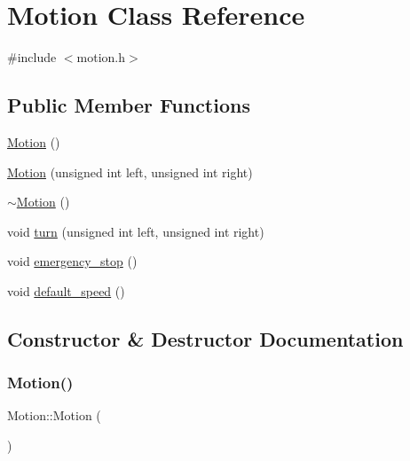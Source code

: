 \hypertarget{class_motion}{}\section{Motion Class Reference}
\label{class_motion}


{\ttfamily \#include $<$motion.\+h$>$}

\subsection*{Public Member Functions}
\begin{DoxyCompactItemize}
\item 
\mbox{\hyperlink{class_motion_a444a2569aaadd10d76b4e6e6bfb3df0c}{Motion}} ()
\item 
\mbox{\hyperlink{class_motion_a3436a9136f3187986be1f9234a0dd7b7}{Motion}} (unsigned int left, unsigned int right)
\item 
\mbox{\hyperlink{class_motion_a3989871f9b2b9b69c88b5437b40a72c6}{$\sim$\+Motion}} ()
\item 
void \mbox{\hyperlink{class_motion_aebf4e426f724cf899044437c83d99e6d}{turn}} (unsigned int left, unsigned int right)
\item 
void \mbox{\hyperlink{class_motion_a44ce916fa9aad6277f0990b14a4259ef}{emergency\+\_\+stop}} ()
\item 
void \mbox{\hyperlink{class_motion_a2eed1fd2eec8bec50c587b2ab33f23b8}{default\+\_\+speed}} ()
\end{DoxyCompactItemize}


\subsection{Constructor \& Destructor Documentation}
\mbox{\label{class_motion_a444a2569aaadd10d76b4e6e6bfb3df0c}} 
\subsubsection{\texorpdfstring{Motion()}{Motion()}\hspace{0.1cm}{\footnotesize\ttfamily [1/2]}}
{\footnotesize\ttfamily Motion\+::\+Motion (\begin{DoxyParamCaption}{ }\end{DoxyParamCaption})}

\mbox{\label{class_motion_a3436a9136f3187986be1f9234a0dd7b7}} 
